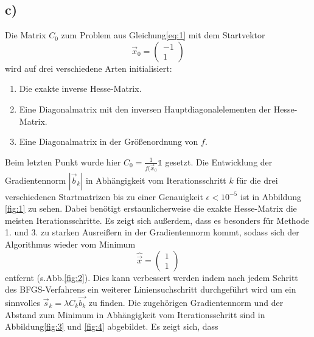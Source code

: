 \subsection*{c)}
\label{sec:c}
Die Matrix $C_0$ zum Problem aus Gleichung\eqref{eq:1} mit dem Startvektor
\[
\vec{x}_0 = \begin{pmatrix}
-1\\
1
\end{pmatrix}
\]
wird auf drei verschiedene Arten initialisiert:
\begin{enumerate}
\item Die exakte inverse Hesse-Matrix.
\item Eine Diagonalmatrix mit den inversen Hauptdiagonalelementen der Hesse-Matrix.
\item Eine Diagonalmatrix in der Größenordnung von $f$.
\end{enumerate}
Beim letzten Punkt wurde hier $C_0 = \frac{1}{f(\vec{x}_0}\mathds{1}$ gesetzt.
Die Entwicklung der Gradientennorm $|\vec{b}_k|$ in Abhängigkeit vom Iterationsschritt $k$ für die drei verschiedenen Startmatrizen bis zu einer Genauigkeit $\epsilon < 10^{-5}$ ist in Abbildung \ref{fig:1} zu sehen. Dabei benötigt erstaunlicherweise die exakte Hesse-Matrix die meisten Iterationsschritte. Es zeigt sich außerdem, dass es besonders für Methode 1. und 3. zu starken Ausreißern in der Gradientennorm kommt, sodass sich der Algorithmus wieder vom Minimum 
\[
\hat{\vec{x}} = \begin{pmatrix}
1 \\
1
\end{pmatrix}
\]
entfernt (s.Abb.\ref{fig:2}).
Dies kann verbessert werden indem nach jedem Schritt des BFGS-Verfahrens ein weiterer Liniensuchschritt durchgeführt wird um ein sinnvolles $\vec{s}_k = \lambda C_k \vec{b_{k}}$ zu finden.
Die zugehörigen Gradientennorm und der Abstand zum Minimum in Abhängigkeit vom Iterationsschritt sind in Abbildung\ref{fig:3} und \ref{fig:4} abgebildet.
Es zeigt sich, dass
